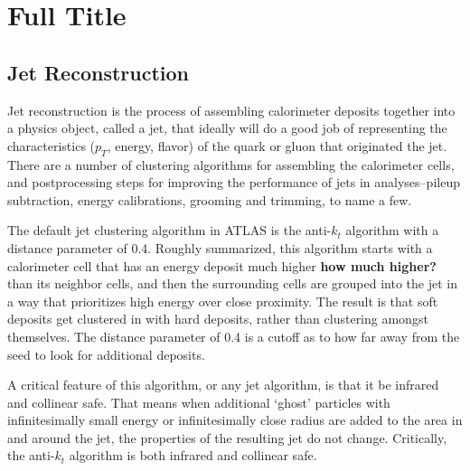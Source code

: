  

\chapter[RecoPerfChapter]{Full Title}



\section{Jet Reconstruction}
Jet reconstruction is the process of assembling calorimeter deposits together into a physics object, called a jet, that ideally will do a good job of representing the characteristics ($p_T$, energy, flavor) of the quark or gluon that originated the jet.  There are a number of clustering algorithms for assembling the calorimeter cells, and postprocessing steps for improving the performance of jets in analyses--pileup subtraction, energy calibrations, grooming and trimming, to name a few.  

The default jet clustering algorithm in ATLAS is the anti-$k_t$ algorithm with a distance parameter of 0.4.  Roughly summarized, this algorithm starts with a calorimeter cell that has an energy deposit much higher \textbf{how much higher?} than its neighbor cells, and then the surrounding cells are grouped into the jet in a way that prioritizes high energy over close proximity.  The result is that soft deposits get clustered in with hard deposits, rather than clustering amongst themselves.  The distance parameter of 0.4 is a cutoff as to how far away from the seed to look for additional deposits.  

A critical feature of this algorithm, or any jet algorithm, is that it be infrared and collinear safe.  That means when additional `ghost' particles with infinitesimally small energy or infinitesimally close radius are added to the area in and around the jet, the properties of the resulting jet do not change.  Critically, the anti-$k_t$ algorithm is both infrared and collinear safe.







